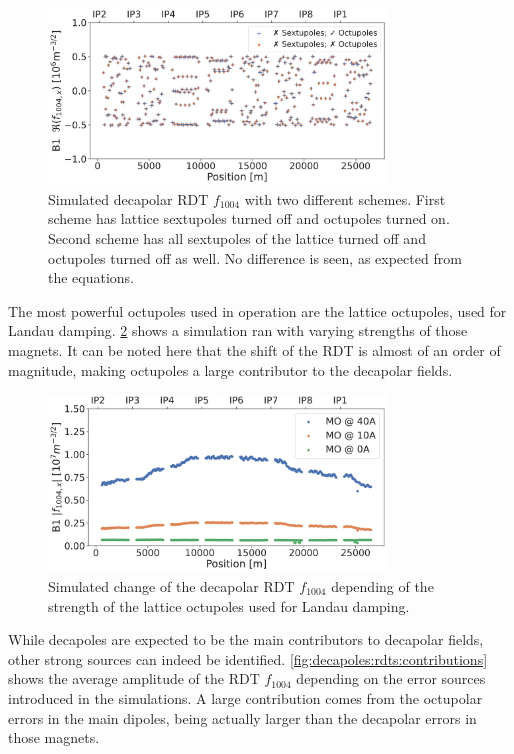 \begin{figure}[!htb]
    \centering
    \includegraphics[width=0.8\textwidth]{./images/f1004/f1004_no_ms.pdf}
    \caption{Simulated decapolar RDT $f_{1004}$ with two different schemes. First scheme has
    lattice sextupoles turned off and octupoles turned on. Second scheme has all sextupoles of the
    lattice turned off and octupoles turned off as well. No difference is seen, as expected from
    the equations.}
    \label{fig:decapoles:rdts:sectupole_octupole_no_diff}
\end{figure}

The most powerful octupoles used in operation are the lattice octupoles, used for Landau damping.
\cref{fig:decapoles:rdts:simulation_mo_powered} shows a simulation ran with varying strengths of
those magnets. It can be noted here that the shift of the RDT is almost of an order of magnitude,
making octupoles a large contributor to the decapolar fields.

\begin{figure}[!htb]
    \centering
    \includegraphics[width=0.8\textwidth]{./images/f1004/f1004_mo.pdf}
    \caption{Simulated change of the decapolar RDT $f_{1004}$ depending of the strength of the
    lattice octupoles used for Landau damping.}
    \label{fig:decapoles:rdts:simulation_mo_powered}
\end{figure}

While decapoles are expected to be the main contributors to decapolar fields, other strong sources
can indeed be identified. \cref{fig:decapoles:rdts:contributions} shows the average amplitude of the
RDT $f_{1004}$ depending on the error sources introduced in the simulations. A large contribution
comes from the octupolar errors in the main dipoles, being actually larger than the decapolar errors
in those magnets.

